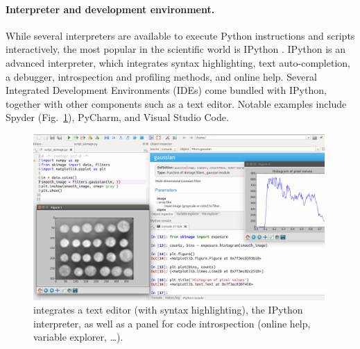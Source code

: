 \documentclass[twocolumn]{bmcart}%
\begin{document}
\paragraph{Interpreter and development environment.}

While several interpreters are available to execute Python instructions
and scripts interactively, the most popular in the scientific world is
IPython \citep{Perez2007, Rossant2015}. IPython is an advanced
interpreter, which integrates syntax highlighting, text auto-completion,
a debugger, introspection and profiling methods, and online help. Several
Integrated Development Environments (IDEs) come bundled with IPython,
together with other components such as a text editor. Notable examples
include Spyder (Fig.~\ref{fig:spyder}), PyCharm, and Visual Studio Code.

\begin{figure}
    \centerline{\includegraphics[width=0.99\textwidth]{spyder_process}}
    \caption{ integrates a text editor (with
	syntax highlighting), the IPython interpreter, as well as a panel
	for code introspection (online help, variable explorer, \dots).
 \label{fig:spyder}}
\end{figure}
\end{document}
